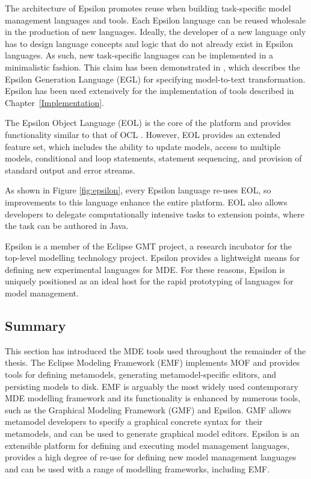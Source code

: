 The architecture of Epsilon promotes reuse when building task-specific model management languages and tools. Each Epsilon language can be reused wholesale in the production of new languages. Ideally, the developer of a new language only has to design language concepts and logic that do not already exist in Epsilon languages. As such, new task-specific languages can be implemented in a minimalistic fashion. This claim has been demonstrated in \cite{rose08egl}, which describes the Epsilon Generation Language (EGL) for specifying model-to-text transformation. Epsilon has been used extensively for the implementation of tools described in Chapter~\ref{Implementation}. 

The Epsilon Object Language (EOL) \cite{kolovos06eol} is the core of the platform and provides functionality similar to that of OCL \cite{ocl2}. However, EOL provides an extended feature set, which includes the ability to update models, access to multiple models, conditional and loop statements, statement sequencing, and provision of standard output and error streams.

As shown in Figure \ref{fig:epsilon}, every Epsilon language re-uses EOL, so improvements to this language enhance the entire platform. EOL also allows developers to delegate computationally intensive tasks to extension points, where the task can be authored in Java.

Epsilon is a member of the Eclipse GMT \cite{gmt} project, a research incubator for the top-level modelling technology project. Epsilon provides a lightweight means for defining new experimental languages for MDE. For these reasons, Epsilon is uniquely positioned as an ideal host for the rapid prototyping of languages for model management.

\subsection{Summary}
This section has introduced the MDE tools used throughout the remainder of the thesis. The Eclipse Modeling Framework (EMF) implements MOF and provides tools for defining metamodels, generating metamodel-specific editors, and persisting models to disk. EMF is arguably the most widely used contemporary MDE modelling framework and its functionality is enhanced by numerous tools, such as the Graphical Modeling Framework (GMF) and Epsilon. GMF allows metamodel developers to specify a graphical concrete syntax for their metamodels, and can be used to generate graphical model editors. Epsilon is an extensible platform for defining and executing model management languages, provides a high degree of re-use for defining new model management languages and can be used with a range of modelling frameworks, including EMF.